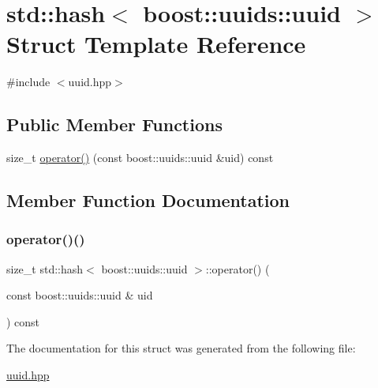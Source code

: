 \hypertarget{structstd_1_1hash_3_01boost_1_1uuids_1_1uuid_01_4}{}\section{std\+:\+:hash$<$ boost\+:\+:uuids\+:\+:uuid $>$ Struct Template Reference}
\label{structstd_1_1hash_3_01boost_1_1uuids_1_1uuid_01_4}


{\ttfamily \#include $<$uuid.\+hpp$>$}

\subsection*{Public Member Functions}
\begin{DoxyCompactItemize}
\item 
size\+\_\+t \hyperlink{structstd_1_1hash_3_01boost_1_1uuids_1_1uuid_01_4_a4cfbd1973b3692bf1837a42320f62b57}{operator()} (const boost\+::uuids\+::uuid \&uid) const
\end{DoxyCompactItemize}


\subsection{Member Function Documentation}
\mbox{\label{structstd_1_1hash_3_01boost_1_1uuids_1_1uuid_01_4_a4cfbd1973b3692bf1837a42320f62b57}} 
\subsubsection{\texorpdfstring{operator()()}{operator()()}}
{\footnotesize\ttfamily size\+\_\+t std\+::hash$<$ boost\+::uuids\+::uuid $>$\+::operator() (\begin{DoxyParamCaption}\item[{const boost\+::uuids\+::uuid \&}]{uid }\end{DoxyParamCaption}) const\hspace{0.3cm}{\ttfamily [inline]}}



The documentation for this struct was generated from the following file\+:\begin{DoxyCompactItemize}
\item 
\hyperlink{uuid_8hpp}{uuid.\+hpp}\end{DoxyCompactItemize}
